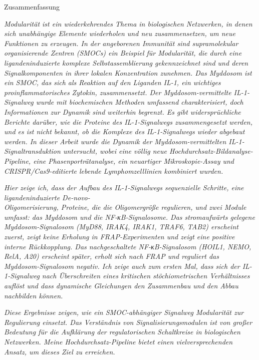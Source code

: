 \begin{center}
{\Large Zusammenfassung}
\end{center}
\textit{Modularität ist ein wiederkehrendes Thema in biologischen Netzwerken, in denen sich unabhängige Elemente wiederholen und neu zusammensetzen, um neue Funktionen zu erzeugen. In der angeborenen Immunität sind supramolekular organisierende Zentren (SMOCs) ein Beispiel für Modularität, die durch eine ligandeninduzierte komplexe Selbstassemblierung gekennzeichnet sind und deren Signalkomponenten in ihrer lokalen Konzentration zunehmen. Das Myddosom ist ein SMOC, das sich als Reaktion auf den Liganden IL-1, ein wichtiges proinflammatorisches Zytokin, zusammensetzt. Der Myddosom-vermittelte IL-1-Signalweg wurde mit biochemischen Methoden umfassend charakterisiert, doch Informationen zur Dynamik sind weiterhin begrenzt. Es gibt widersprüchliche Berichte darüber, wie die Proteine des IL-1-Signalwegs zusammengesetzt werden, und es ist nicht bekannt, ob die Komplexe des IL-1-Signalwegs wieder abgebaut werden. In dieser Arbeit wurde die Dynamik der Myddosom-vermittelten IL-1-Signaltransduktion untersucht, wobei eine völlig neue Hochdurchsatz-Bildanalyse-Pipeline, eine Phasenporträtanalyse, ein neuartiger Mikroskopie-Assay und CRISPR/Cas9-editierte lebende Lymphomzelllinien kombiniert wurden.}

\textit{Hier zeige ich, dass der Aufbau des IL-1-Signalwegs sequenzielle Schritte, eine ligandeninduzierte De-novo-\\Oligomerisierung, Proteine, die die Oligomergröße regulieren, und zwei Module umfasst: das Myddosom und die NF-κB-Signalosome. Das stromaufwärts gelegene Myddosom-Signalosom (MyD88, IRAK4, IRAK1, TRAF6, TAB2) erscheint zuerst, zeigt keine Erholung in FRAP-Experimenten und zeigt eine positive interne Rückkopplung. Das nachgeschaltete NF-κB-Signalosom (HOIL1, NEMO, RelA, A20) erscheint später, erholt sich nach FRAP und reguliert das Myddosom-Signalosom negativ. Ich zeige auch zum ersten Mal, dass sich der IL-1-Signalweg nach Überschreiten eines kritischen stöchiometrischen Verhältnisses auflöst und dass dynamische Gleichungen den Zusammenbau und den Abbau nachbilden können.}

\textit{Diese Ergebnisse zeigen, wie ein SMOC-abhängiger Signalweg Modularität zur Regulierung einsetzt. Das Verständnis von Signalisierungsmodulen ist von großer Bedeutung für die Aufklärung der regulatorischen Schaltkreise in biologischen Netzwerken. Meine Hochdurchsatz-Pipeline bietet einen vielversprechenden Ansatz, um dieses Ziel zu erreichen.}
\vspace{1.0cm}

